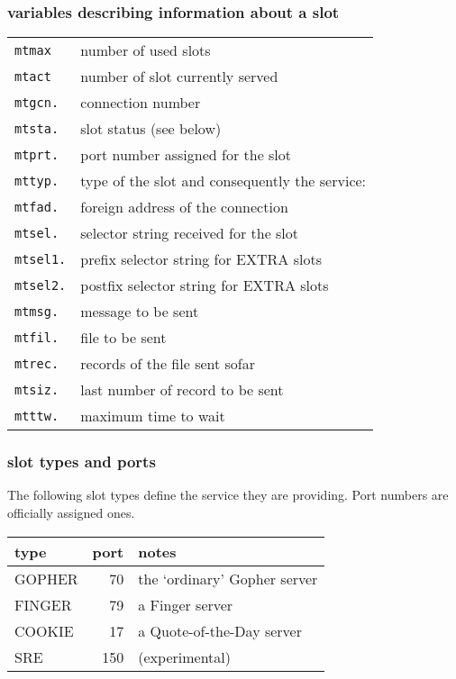

\subsubsection{variables describing information about a slot}
\noindent\begin{tabular}{|l|l|}\hline
   {\tt mtmax  }    & number of used slots \\
   {\tt mtact  }    & number of slot currently served \\ \hline

   {\tt mtgcn. }    & connection number \\
   {\tt mtsta. }    & slot status (see below) \\
   {\tt mtprt. }    & port number assigned for the slot \\
   {\tt mttyp. }    & type of the slot and consequently the service: \\
   {\tt mtfad. }    & foreign address of the connection \\
   {\tt mtsel. }    & selector string received for the slot \\
   {\tt mtsel1.}    & prefix selector string for EXTRA slots \\
   {\tt mtsel2.}    & postfix selector string for EXTRA slots \\
   {\tt mtmsg. }    & message to be sent \\
   {\tt mtfil. }    & file to be sent \\
   {\tt mtrec. }    & records of the file sent sofar \\
   {\tt mtsiz. }    & last number of record to be sent \\
   {\tt mtttw. }    & maximum time to wait \\
\hline\end{tabular}
 


\subsubsection{slot types and ports}
   The following slot types define the service they are providing.
   Port numbers are officially assigned ones.

\noindent\begin{tabular}{|l|r|l|}\hline
   type     & port   &  notes \\
\hline\hline
   GOPHER   & 70     &  the `ordinary' Gopher server \\
   FINGER   & 79     &  a Finger server \\
   COOKIE   & 17     &  a Quote-of-the-Day server \\
   SRE      & 150    &  (experimental) \\
\hline\end{tabular}
 


